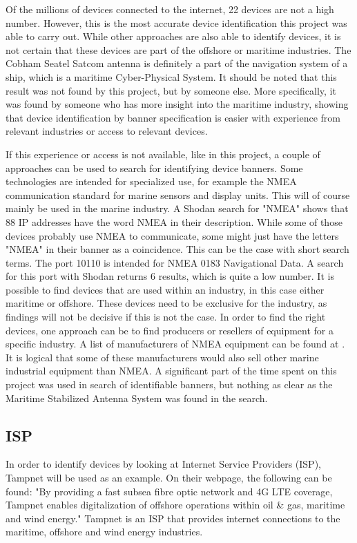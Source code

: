 Of the millions of devices connected to the internet, 22 devices are not a high number. However, this is the most accurate device identification this project was able to carry out. While other approaches are also able to identify devices, it is not certain that these devices are part of the offshore or maritime industries. The Cobham Seatel Satcom antenna is definitely a part of the navigation system of a ship, which is a maritime Cyber-Physical System. 
It should be noted that this result was not found by this project, but by someone else.
More specifically, it was found by someone who has more insight into the maritime industry, showing that device identification by banner specification is easier with experience from relevant industries or access to relevant devices.

If this experience or access is not available, like in this project, a couple of approaches can be used to search for identifying device banners. 
Some technologies are intended for specialized use, for example the NMEA communication standard for marine sensors and display units. \cite{NMEA} This will of course mainly be used in the marine industry. A Shodan search for "NMEA" shows that 88 IP addresses have the word NMEA in their description. While some of those devices probably use NMEA to communicate, some might just have the letters "NMEA" in their banner as a coincidence. This can be the case with short search terms. The port 10110 is intended for NMEA 0183 Navigational Data. \cite{www_ports} A search for this port with Shodan returns 6 results, which is quite a low number. 
It is possible to find devices that are used within an industry, in this case either maritime or offshore. These devices need to be exclusive for the industry, as findings will not be decisive if this is not the case. In order to find the right devices, one approach can be to find producers or resellers of equipment for a specific industry. A list of manufacturers of NMEA equipment can be found at \cite{NMEA}. It is logical that some of these manufacturers would also sell other marine industrial equipment than NMEA. 
A significant part of the time spent on this project was used in search of identifiable banners, but nothing as clear as the Maritime Stabilized Antenna System was found in the search. 


\subsection{ISP}
In order to identify devices by looking at Internet Service Providers (ISP), Tampnet will be used as an example. On their webpage, the following can be found: "By providing a fast subsea fibre optic network and 4G LTE coverage, Tampnet enables digitalization of offshore operations within oil \& gas, maritime and wind energy." \cite{tampnet} Tampnet is an ISP that provides internet connections to the maritime, offshore and wind energy industries. 

